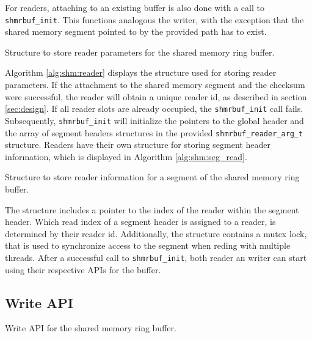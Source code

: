 \par
For readers, attaching to an existing buffer is also done with a call to \texttt{shmrbuf\_init}. This functions analogous the writer, with the exception that the
shared memory segment pointed to by the provided path has to exist. 
\begin{algorithm}[h!]
    
    \label{alg:shm:reader_arg}
    \caption[Shared Memory Ringbuffer: Reader Parameters]{Structure to store reader parameters for the shared memory ring buffer.}
\end{algorithm}
Algorithm \ref{alg:shm:reader} displays the structure used for storing reader parameters. If the attachment to the shared memory segment
and the checksum were successful, the reader will obtain a unique reader id, as described in section \ref{sec:design}. If all reader slots are already occupied, the \texttt{shmrbuf\_init} call fails.
Subsequently, \texttt{shmrbuf\_init} will initialize the pointers to the global header and the array of segment headers structures in the provided \texttt{shmrbuf\_reader\_arg\_t} structure.  
Readers have their own structure for storing segment header information, which is displayed in Algorithm \ref{alg:shm:seg_read}.  
\begin{algorithm}[h!]
    
    \label{alg:shm:seg_read}
    \caption[Shared Memory Ringbuffer: Reader Segment Header]{Structure to store reader information for a segment of the shared memory ring buffer.}
\end{algorithm}

The structure includes a pointer to the index of the reader within the segment header. Which read index of a segment header is assigned to a reader, is determined 
by their reader id. Additionally, the structure contains a mutex lock, that is used to synchronize access to the segment when reding with multiple threads.
After a successful call to \texttt{shmrbuf\_init}, both reader an writer can start using their respective APIs for the buffer.

\subsection{Write API}

\begin{algorithm}[h!]
    
    \label{alg:shm:write_api}
    \caption[Shared Memory Ringbuffer: Write API]{Write API for the shared memory ring buffer.}
\end{algorithm}

